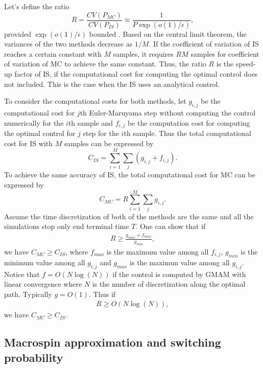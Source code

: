 \documentclass[journal,transmag]{IEEEtran}
\begin{document}
Let's define the ratio 
\begin{equation}
R = \frac{CV(P_{MC}) }{CV(P_{IS}) } \approx \frac{1}{P \exp(o(1)/\epsilon)},
\end{equation} 
provided $\exp(o(1)/\epsilon)$ bounded \cite{RES_Eric}. Based on the central limit theorem, the variances of the two methods decrease as $1/M$. If the coefficient of variation of IS reaches a certain constant with $M$ samples, it requires $R M$ samples for coefficient of variation of MC to achieve the same constant. Thus, the ratio $R$ is the speed-up factor of IS, if the computational cost for computing the optimal control does not included. This is the case when the IS uses an analytical control. 

To consider the computational costs for both methods, let  $g_{i,j}$ be the computational cost for $j$th Euler-Maruyama step without computing the control numerically for the $i$th sample and  $f_{i,j}$ be the computation cost for computing the optimal control for $j$ step for the $i$th sample. Thus the total computational cost for IS with $M$ samples can be expressed by 
\begin{equation}
C_{IS} =\sum_{i = 1}^M \sum_j (g_{i,j} + f_{i,j}). 
\end{equation}
To achieve the same accuracy of IS, the total computational cost for MC can be expressed by 
\begin{equation}
C_{MC} =R \sum_{i = 1}^M \sum_j g_{i,j}. 
\end{equation}
Assume the time discretization of both of the methods are the same and all the simulations stop only end terminal time $T$. One can show that if 
\begin{eqnarray}
R \ge \frac{g_{max}+f_{max}}{g_{min}},
\end{eqnarray}
we have $ C_{MC} \ge C_{IS}$, where $f_{max}$ is the maximum value among all $f_{i,j}$, $g_{min}$ is the minimum value among all $g_{i,j}$ and $g_{max}$ is the maximun value among all $g_{i,j}$. Notice that $f = O(N \log (N))$ if the control is computed by GMAM with linear convergence where $N$ is the number of discretization along the optimal path. Typically $g = O(1)$. Thus if 
\begin{eqnarray}
R \ge  O(N \log (N)),
\end{eqnarray}
we have $ C_{MC} \ge C_{IS}$.

\subsection{Macrospin approximation and switching probability}
\end{document}
